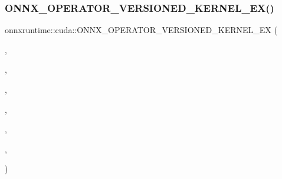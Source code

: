 \subsubsection{\texorpdfstring{O\+N\+N\+X\+\_\+\+O\+P\+E\+R\+A\+T\+O\+R\+\_\+\+V\+E\+R\+S\+I\+O\+N\+E\+D\+\_\+\+K\+E\+R\+N\+E\+L\+\_\+\+E\+X()}{ONNX\_OPERATOR\_VERSIONED\_KERNEL\_EX()}}
{\footnotesize\ttfamily onnxruntime\+::cuda\+::\+O\+N\+N\+X\+\_\+\+O\+P\+E\+R\+A\+T\+O\+R\+\_\+\+V\+E\+R\+S\+I\+O\+N\+E\+D\+\_\+\+K\+E\+R\+N\+E\+L\+\_\+\+EX (\begin{DoxyParamCaption}\item[{\mbox{\hyperlink{classonnxruntime_1_1cuda_1_1Reshape__1}{Reshape\+\_\+1}}}]{,  }\item[{\mbox{\hyperlink{namespaceonnxruntime_ac0e7c0c106a2c9e9594560a3ab289fa0}{k\+Onnx\+Domain}}}]{,  }\item[{1}]{,  }\item[{4}]{,  }\item[{\mbox{\hyperlink{namespaceonnxruntime_a73ebc64887ddd1968e3cef47ffefe35b}{k\+Cuda\+Execution\+Provider}}}]{,  }\item[{\mbox{\hyperlink{classonnxruntime_1_1KernelDefBuilder}{Kernel\+Def\+Builder}}() .Alias(0, 0) .Type\+Constraint(\char`\"{}T\char`\"{}, Data\+Type\+Impl\+::\+All\+Fixed\+Size\+Tensor\+Types())}]{,  }\item[{\mbox{\hyperlink{classonnxruntime_1_1cuda_1_1Reshape__1}{Reshape\+\_\+1}}}]{ }\end{DoxyParamCaption})}

\mbox{\label{namespaceonnxruntime_1_1cuda_a1ae0efea3f785f7ec62e386bed42a514}} 
